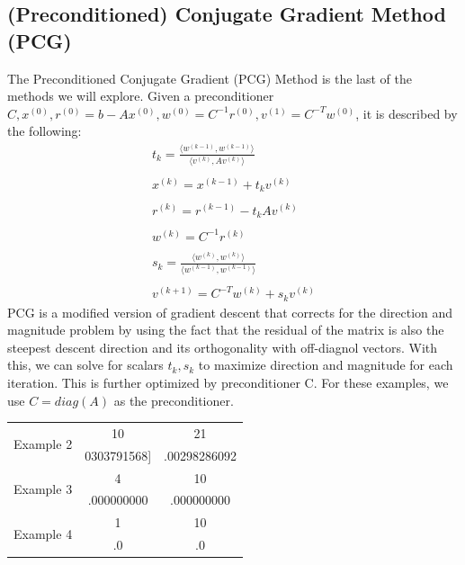 \documentclass[11pt]{article}	%
\begin{document}
\subsection{(Preconditioned) Conjugate Gradient Method (PCG)}
The Preconditioned Conjugate Gradient (PCG) Method is the last of the methods we will explore. Given a preconditioner $C, x^{(0)}, r^{(0)} = b - Ax^{(0)}, w^{(0)} = C^{-1}r^{(0)}, v^{(1)} = C^{-T}w^{(0)}$, it is described by the following:
\begin{align*}\label{eq:precondition-conj-grad-eq-1}
    t_k = \frac{\langle w^{(k-1)}, w^{(k-1)}\rangle}{\langle v^{(k)}, Av^{(k)}\rangle} \\\\
    x^{(k)} = x^{(k-1)} + t_kv^{(k)} \\\\
    r^{(k)} = r^{(k-1)} - t_kAv^{(k)} \\\\
    w^{(k)} = C^{-1}r^{(k)} \\\\
    s_k = \frac{\langle w^{(k)}, w^{(k)}\rangle}{\langle w^{(k-1)}, w^{(k-1)}\rangle} \\\\
    v^{(k+1)} = C^{-T}w^{(k)} + s_kv^{(k)}
\end{align*}
PCG is a modified version of gradient descent that corrects for the direction and magnitude problem by using the fact that the residual of the matrix is also the steepest descent direction and its orthogonality with off-diagnol vectors. With this, we can solve for scalars $t_k, s_k$ to maximize direction and magnitude for each iteration. This is further optimized by preconditioner C. For these examples, we use $ C = diag(A) $ as the preconditioner.
\pagebreak
\begin{center}
	 \label{tab:title}
    \begin{tabular}{||c|c|c||}
        \hline
        \multirow{2}{5em}{Example 2} & 10 & 21 \\ [.25em]
        & 0303791568] & .00298286092\\ [.25em]
        \hline\hline
        \multirow{2}{5em}{Example 3} & 4 & 10 \\ [.25em]
        & .000000000 & .000000000 \\ [.25em]
        \hline
        \multirow{2}{5em}{Example 4} & 1 & 10 \\ [.25em]
        & .0 & .0 \\ [.25em]
        \hline
    \end{tabular}
\end{center}
\end{document}
